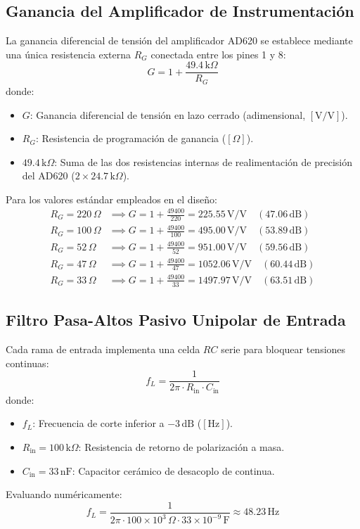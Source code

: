 \documentclass[10pt,a4paper]{article}
\begin{document}
\subsection{Ganancia del Amplificador de Instrumentación}
La ganancia diferencial de tensión del amplificador AD620 se establece mediante una única resistencia externa $R_G$ conectada entre los pines 1 y 8:
\begin{equation}
    G = 1 + \frac{49.4\,\text{k}\Omega}{R_G}
\end{equation}
donde:
\begin{itemize}
    \item $G$: Ganancia diferencial de tensión en lazo cerrado (adimensional, $[\text{V/V}]$).
    \item $R_G$: Resistencia de programación de ganancia ($[\Omega]$).
    \item $49.4\,\text{k}\Omega$: Suma de las dos resistencias internas de realimentación de precisión del AD620 ($2 \times 24.7\,\text{k}\Omega$).
\end{itemize}

Para los valores estándar empleados en el diseño:
\begin{align}
    R_G = 220\,\Omega &\implies G = 1 + \frac{49400}{220} = 225.55\,\text{V/V} \quad (47.06\,\text{dB}) \\
    R_G = 100\,\Omega &\implies G = 1 + \frac{49400}{100} = 495.00\,\text{V/V} \quad (53.89\,\text{dB}) \\
    R_G = 52\,\Omega &\implies G = 1 + \frac{49400}{52} = 951.00\,\text{V/V} \quad (59.56\,\text{dB}) \\
    R_G = 47\,\Omega &\implies G = 1 + \frac{49400}{47} = 1052.06\,\text{V/V} \quad (60.44\,\text{dB}) \\
    R_G = 33\,\Omega &\implies G = 1 + \frac{49400}{33} = 1497.97\,\text{V/V} \quad (63.51\,\text{dB})
\end{align}

\subsection{Filtro Pasa-Altos Pasivo Unipolar de Entrada}
Cada rama de entrada implementa una celda $RC$ serie para bloquear tensiones continuas:
\begin{equation}
    f_L = \frac{1}{2\pi \cdot R_{\text{in}} \cdot C_{\text{in}}}
\end{equation}
donde:
\begin{itemize}
    \item $f_L$: Frecuencia de corte inferior a $-3\,\text{dB}$ ($[\text{Hz}]$).
    \item $R_{\text{in}} = 100\,\text{k}\Omega$: Resistencia de retorno de polarización a masa.
    \item $C_{\text{in}} = 33\,\text{nF}$: Capacitor cerámico de desacoplo de continua.
\end{itemize}
Evaluando numéricamente:
\begin{equation}
    f_L = \frac{1}{2\pi \cdot 100 \times 10^3\,\Omega \cdot 33 \times 10^{-9}\,\text{F}} \approx 48.23\,\text{Hz}
\end{equation}
\end{document}

